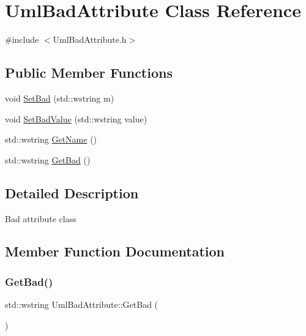 \hypertarget{class_uml_bad_attribute}{}\section{Uml\+Bad\+Attribute Class Reference}
\label{class_uml_bad_attribute}


{\ttfamily \#include $<$Uml\+Bad\+Attribute.\+h$>$}

\subsection*{Public Member Functions}
\begin{DoxyCompactItemize}
\item 
void \mbox{\hyperlink{class_uml_bad_attribute_a2194494496b2f67bd599a410acdedefb}{Set\+Bad}} (std\+::wstring m)
\item 
void \mbox{\hyperlink{class_uml_bad_attribute_aa9257887d957755f3eb007266c35838b}{Set\+Bad\+Value}} (std\+::wstring value)
\item 
std\+::wstring \mbox{\hyperlink{class_uml_bad_attribute_ae41e1ecb7b0f29eeb17e1f5a9baaa3e5}{Get\+Name}} ()
\item 
std\+::wstring \mbox{\hyperlink{class_uml_bad_attribute_a36bf763e9d5afe4c8745b0d69aaf7fe3}{Get\+Bad}} ()
\end{DoxyCompactItemize}


\subsection{Detailed Description}
Bad attribute class 

\subsection{Member Function Documentation}
\mbox{\label{class_uml_bad_attribute_a36bf763e9d5afe4c8745b0d69aaf7fe3}} 
\subsubsection{\texorpdfstring{GetBad()}{GetBad()}}
{\footnotesize\ttfamily std\+::wstring Uml\+Bad\+Attribute\+::\+Get\+Bad (\begin{DoxyParamCaption}{ }\end{DoxyParamCaption})\hspace{0.3cm}{\ttfamily [inline]}}

